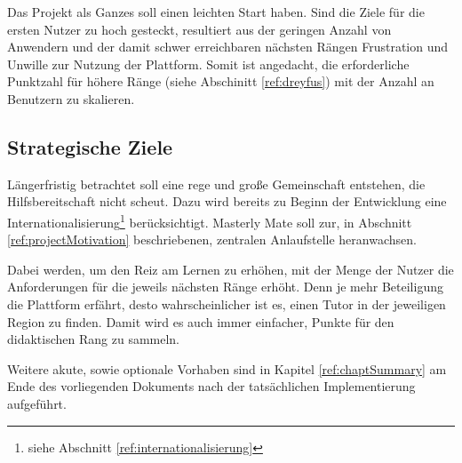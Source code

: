 Das Projekt als Ganzes soll einen leichten Start haben. Sind die Ziele für die
ersten Nutzer zu hoch gesteckt, resultiert aus der geringen Anzahl von Anwendern
und der damit schwer erreichbaren nächsten Rängen Frustration und Unwille zur
Nutzung der Plattform. Somit ist angedacht, die erforderliche Punktzahl für
höhere Ränge (siehe Abschinitt \ref{ref:dreyfus}) mit der Anzahl an Benutzern zu
skalieren.

\subsection{Strategische Ziele}
Längerfristig betrachtet soll eine rege und große Gemeinschaft entstehen, die
Hilfsbereitschaft nicht scheut. Dazu wird bereits zu Beginn der Entwicklung eine
Internationalisierung\footnote{siehe Abschnitt \ref{ref:internationalisierung}}
berücksichtigt. Masterly Mate soll zur, in Abschnitt \ref{ref:projectMotivation}
beschriebenen, zentralen Anlaufstelle heranwachsen.

Dabei werden, um den Reiz am Lernen zu erhöhen, mit der Menge der Nutzer die
Anforderungen für die jeweils nächsten Ränge erhöht. Denn je mehr Beteiligung
die Plattform erfährt, desto wahrscheinlicher ist es, einen Tutor in der
jeweiligen Region zu finden. Damit wird es auch immer einfacher, Punkte für den
didaktischen Rang zu sammeln.

Weitere akute, sowie optionale Vorhaben sind in Kapitel \ref{ref:chaptSummary}
am Ende des vorliegenden Dokuments nach der tatsächlichen
Implementierung aufgeführt.
